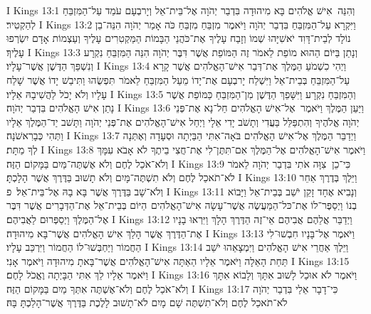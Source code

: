 I Kings 13:1	וְהִנֵּה  אִישׁ אֱלֹהִים בָּא מִיהוּדָה בִּדְבַר יְהֹוָה אֶל־בֵּית־אֵל וְיָרבְעָם עֹמֵד עַל־הַמִּזְבֵּחַ לְהַקְטִיר׃
I Kings 13:2	וַיִּקְרָא עַל־הַמִּזְבֵּחַ בִּדְבַר יְהֹוָה וַיֹּאמֶר מִזְבֵּחַ מִזְבֵּחַ כֹּה אָמַר יְהֹוָה הִנֵּה־בֵן נוֹלָד לְבֵית־דָּוִד יֹאשִׁיָּהוּ שְׁמוֹ וְזָבַח עָלֶיךָ אֶת־כֹּהֲנֵי הַבָּמוֹת הַמַּקְטִרִים עָלֶיךָ וְעַצְמוֹת אָדָם יִשְׂרְפוּ עָלֶיךָ׃
I Kings 13:3	וְנָתַן בַּיּוֹם הַהוּא מוֹפֵת לֵאמֹר זֶה הַמּוֹפֵת אֲשֶׁר דִּבֶּר יְהֹוָה הִנֵּה הַמִּזְבֵּחַ נִקְרָע וְנִשְׁפַּךְ הַדֶּשֶׁן אֲשֶׁר־עָלָיו׃
I Kings 13:4	וַיְהִי כִשְׁמֹעַ הַמֶּלֶךְ אֶת־דְּבַר אִישׁ־הָאֱלֹהִים אֲשֶׁר קָרָא עַל־הַמִּזְבֵּחַ בְּבֵית־אֵל וַיִּשְׁלַח יָרבְעָם אֶת־יָדוֹ מֵעַל הַמִּזְבֵּחַ לֵאמֹר  תִּפְשֻׂהוּ וַתִּיבַשׁ יָדוֹ אֲשֶׁר שָׁלַח עָלָיו וְלֹא יָכֹל לַהֲשִׁיבָהּ אֵלָיו׃
I Kings 13:5	וְהַמִּזְבֵּחַ נִקְרָע וַיִּשָּׁפֵךְ הַדֶּשֶׁן מִן־הַמִּזְבֵּחַ כַּמּוֹפֵת אֲשֶׁר נָתַן אִישׁ הָאֱלֹהִים בִּדְבַר יְהֹוָה׃
I Kings 13:6	וַיַּעַן הַמֶּלֶךְ וַיֹּאמֶר  אֶל־אִישׁ הָאֱלֹהִים חַל־נָא אֶת־פְּנֵי יְהֹוָה אֱלֹהֶיךָ וְהִתְפַּלֵּל בַּעֲדִי וְתָשֹׁב יָדִי אֵלָי וַיְחַל אִישׁ־הָאֱלֹהִים אֶת־פְּנֵי יְהֹוָה וַתָּשׁב יַד־הַמֶּלֶךְ אֵלָיו וַתְּהִי כְּבָרִאשֹׁנָה׃
I Kings 13:7	וַיְדַבֵּר הַמֶּלֶךְ אֶל־אִישׁ הָאֱלֹהִים בֹּאָה־אִתִּי הַבַּיְתָה וּסְעָדָה וְאֶתְּנָה לְךָ מַתָּת׃
I Kings 13:8	וַיֹּאמֶר אִישׁ־הָאֱלֹהִים אֶל־הַמֶּלֶךְ אִם־תִּתֶּן־לִי אֶת־חֲצִי בֵיתֶךָ לֹא אָבֹא עִמָּךְ וְלֹא־אֹכַל לֶחֶם וְלֹא אֶשְׁתֶּה־מַּיִם בַּמָּקוֹם הַזֶּה׃
I Kings 13:9	כִּי־כֵן  צִוָּה אֹתִי בִּדְבַר יְהֹוָה לֵאמֹר לֹא־תֹאכַל לֶחֶם וְלֹא תִשְׁתֶּה־מָּיִם וְלֹא תָשׁוּב בַּדֶּרֶךְ אֲשֶׁר הָלָכְתָּ׃
I Kings 13:10	וַיֵּלֶךְ בְּדֶרֶךְ אַחֵר וְלֹא־שָׁב בַּדֶּרֶךְ אֲשֶׁר בָּא בָהּ אֶל־בֵּית־אֵל׃ {פ}
I Kings 13:11	וְנָבִיא אֶחָד זָקֵן יֹשֵׁב בְּבֵית־אֵל וַיָּבוֹא בְנוֹ וַיְסַפֶּר־לוֹ אֶת־כּל־הַמַּעֲשֶׂה אֲשֶׁר־עָשָׂה אִישׁ־הָאֱלֹהִים  הַיּוֹם בְּבֵית־אֵל אֶת־הַדְּבָרִים אֲשֶׁר דִּבֶּר אֶל־הַמֶּלֶךְ וַיְסַפְּרוּם לַאֲבִיהֶם׃
I Kings 13:12	וַיְדַבֵּר אֲלֵהֶם אֲבִיהֶם אֵי־זֶה הַדֶּרֶךְ הָלָךְ וַיִּרְאוּ בָנָיו אֶת־הַדֶּרֶךְ אֲשֶׁר הָלַךְ אִישׁ הָאֱלֹהִים אֲשֶׁר־בָּא מִיהוּדָה׃
I Kings 13:13	וַיֹּאמֶר אֶל־בָּנָיו חִבְשׁוּ־לִי הַחֲמוֹר וַיַּחְבְּשׁוּ־לוֹ הַחֲמוֹר וַיִּרְכַּב עָלָיו׃
I Kings 13:14	וַיֵּלֶךְ אַחֲרֵי אִישׁ הָאֱלֹהִים וַיִּמְצָאֵהוּ יֹשֵׁב תַּחַת הָאֵלָה וַיֹּאמֶר אֵלָיו הַאַתָּה אִישׁ־הָאֱלֹהִים אֲשֶׁר־בָּאתָ מִיהוּדָה וַיֹּאמֶר אָנִי׃
I Kings 13:15	וַיֹּאמֶר אֵלָיו לֵךְ אִתִּי הַבָּיְתָה וֶאֱכֹל לָחֶם׃
I Kings 13:16	וַיֹּאמֶר לֹא אוּכַל לָשׁוּב אִתָּךְ וְלָבוֹא אִתָּךְ וְלֹא־אֹכַל לֶחֶם וְלֹא־אֶשְׁתֶּה אִתְּךָ מַיִם בַּמָּקוֹם הַזֶּה׃
I Kings 13:17	כִּי־דָבָר אֵלַי בִּדְבַר יְהֹוָה לֹא־תֹאכַל לֶחֶם וְלֹא־תִשְׁתֶּה שָׁם מָיִם לֹא־תָשׁוּב לָלֶכֶת בַּדֶּרֶךְ אֲשֶׁר־הָלַכְתָּ בָּהּ׃
